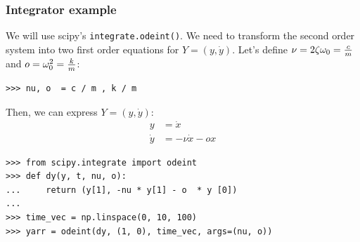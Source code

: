 \documentclass[10pt,colorlinks]{beamer}
\begin{document}
\begin{frame}[fragile]\frametitle{Integrator example}
We will use scipy's \verb|integrate.odeint()|. We need to transform the second order system into two first order equations for $Y=(y, \dot y)$. Let's define $\nu = 2 \zeta \omega_0 = {c \over m}$ and $ o = \omega_0^2={k \over m}$:
\begin{verbatim}
>>> nu, o  = c / m , k / m
\end{verbatim}

Then, we can express $Y= (y, \dot y )$: 
\begin{align}
    y&=\dot x \\
    \dot y &= -\nu \dot x - o x
\end{align}
\begin{verbatim}
>>> from scipy.integrate import odeint
>>> def dy(y, t, nu, o):
...     return (y[1], -nu * y[1] - o  * y [0])
... 
>>> time_vec = np.linspace(0, 10, 100)
>>> yarr = odeint(dy, (1, 0), time_vec, args=(nu, o))
\end{verbatim}

\end{frame}
\end{document}
